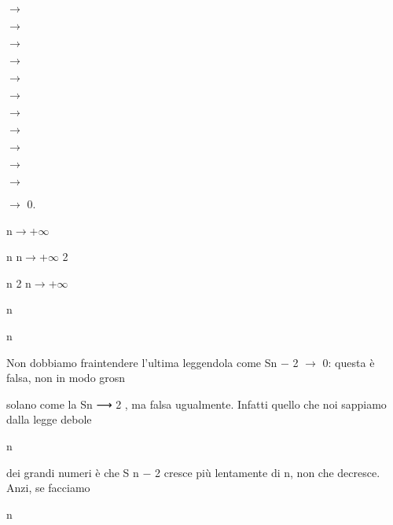 \documentclass[a4paper,portrait,12pt]{article}
\begin{document}
$\rightarrow$


$\rightarrow$


$\rightarrow$


$\rightarrow$


$\rightarrow$


$\rightarrow$


$\rightarrow$


$\rightarrow$


$\rightarrow$


$\rightarrow$


$\rightarrow$


$\rightarrow$ 0.


\begin{flushleft}
n$\rightarrow$+$\infty$
\end{flushleft}


\begin{flushleft}
n n$\rightarrow$+$\infty$ 2
\end{flushleft}


\begin{flushleft}
n 2 n$\rightarrow$+$\infty$
\end{flushleft}


\begin{flushleft}
n
\end{flushleft}


\begin{flushleft}
n
\end{flushleft}


\begin{flushleft}
Non dobbiamo fraintendere l'ultima leggendola come Sn $-$ 2 $\rightarrow$ 0: questa \`{e} falsa, non in modo grosn
\end{flushleft}


\begin{flushleft}
solano come la Sn ⟶ 2 , ma falsa ugualmente. Infatti quello che noi sappiamo dalla legge debole
\end{flushleft}


\begin{flushleft}
n
\end{flushleft}


\begin{flushleft}
dei grandi numeri \`{e} che S n $-$ 2 cresce più lentamente di n, non che decresce. Anzi, se facciamo
\end{flushleft}


\begin{flushleft}
n
\end{flushleft}
\end{document}
